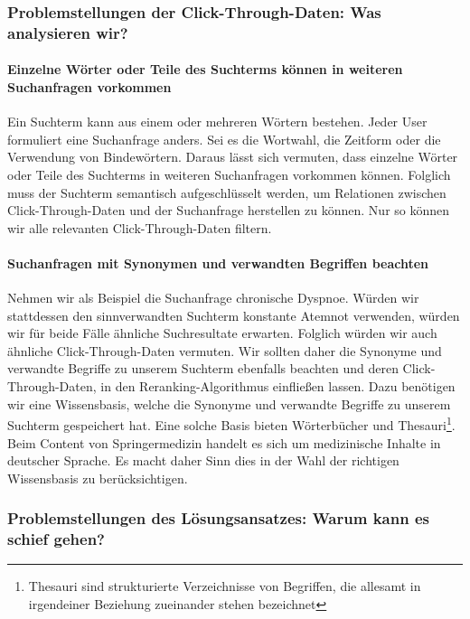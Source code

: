 \subsubsection{Problemstellungen der Click-Through-Daten: Was analysieren wir?}
\label{sec:Grundlagen:Grundbegriffe:SemantikUserInteraktionen:ProblemstellungenClick-Through-Daten}

\paragraph{Einzelne Wörter oder Teile des Suchterms können in weiteren Suchanfragen vorkommen}
Ein Suchterm kann aus einem oder mehreren Wörtern bestehen. Jeder User formuliert eine Suchanfrage anders. Sei es die Wortwahl, die Zeitform oder die Verwendung von Bindewörtern. Daraus lässt sich vermuten, dass einzelne Wörter oder Teile des Suchterms in weiteren Suchanfragen vorkommen können. Folglich muss der Suchterm semantisch aufgeschlüsselt werden, um Relationen zwischen Click-Through-Daten und der Suchanfrage herstellen zu können. Nur so können wir alle relevanten Click-Through-Daten filtern.

\pagebreak

\paragraph{Suchanfragen mit Synonymen und verwandten Begriffen beachten}
Nehmen wir als Beispiel die Suchanfrage \glqq chronische Dyspnoe\grqq{}. Würden wir stattdessen den sinnverwandten Suchterm \glqq konstante Atemnot\grqq{} verwenden, würden wir für beide Fälle ähnliche Suchresultate erwarten. Folglich würden wir auch ähnliche Click-Through-Daten vermuten. Wir sollten daher die Synonyme und verwandte Begriffe zu unserem Suchterm ebenfalls beachten und deren Click-Through-Daten, in den Reranking-Algorithmus einfließen lassen. Dazu benötigen wir eine Wissensbasis, welche die Synonyme und verwandte Begriffe zu unserem Suchterm gespeichert hat. Eine solche Basis bieten Wörterbücher und Thesauri\footnote{Thesauri sind strukturierte Verzeichnisse von Begriffen, die allesamt in irgendeiner Beziehung zueinander stehen bezeichnet}. Beim Content von Springermedizin handelt es sich um medizinische Inhalte in deutscher Sprache. Es macht daher Sinn dies in der Wahl der richtigen Wissensbasis zu berücksichtigen.

\subsubsection{Problemstellungen des Lösungsansatzes: Warum kann es schief gehen?}
\label{sec:Grundlagen:Grundbegriffe:SemantikUserInteraktionen:ProblemstellungenLoesungsansatz} 

